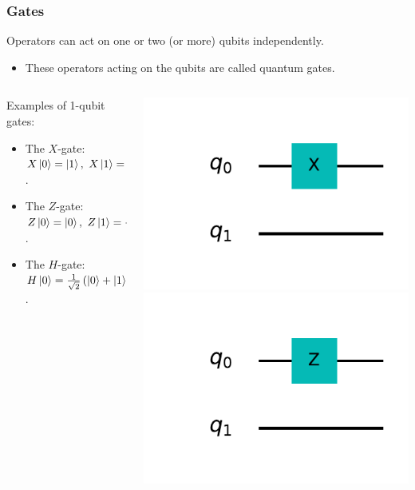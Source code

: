 \documentclass{beamer}
\renewcommand{\(}{\left(}
\renewcommand{\)}{\right)}
\renewcommand{\[}{\left[}
\renewcommand{\]}{\right]}
\begin{document}
\begin{frame}
    \frametitle{Gates}
    Operators can act on  one or two (or more) qubits independently. 
    \begin{itemize}
        \item These operators acting on the qubits are called quantum gates.
    \end{itemize}\pause
    \vspace{10pt}
    \begin{columns}
        \begin{column}[]{0.8\textwidth}
            Examples of 1-qubit gates: 
            \begin{itemize}
                \item The $X$-gate: $X\ket{0} = \ket{1}, \ X\ket{1} = \ket{0}$. 
                \item The $Z$-gate: $Z\ket{0} = \ket{0}, \ Z\ket{1} = -\ket{1}$.
                \item The $H$-gate: $H\ket{0} = \frac{1}{\sqrt{2}} \(\ket{0}  + \ket{1}\),\ H\ket{1}  = \frac{1}{\sqrt{2}} \(\ket{0} - \ket{1}\)$.       
            \end{itemize}
        \end{column}
        \begin{column}[]{0.2\textwidth}
            \centering
            \includegraphics[scale=0.5, trim = 100 65 40 30, clip]{x_qubit_1.pdf} 
            \includegraphics[scale=0.5, trim = 100 65 40 35, clip]{z_qubit_1.pdf} 

\end{column}
\end{columns}
\end{frame}
\end{document}
